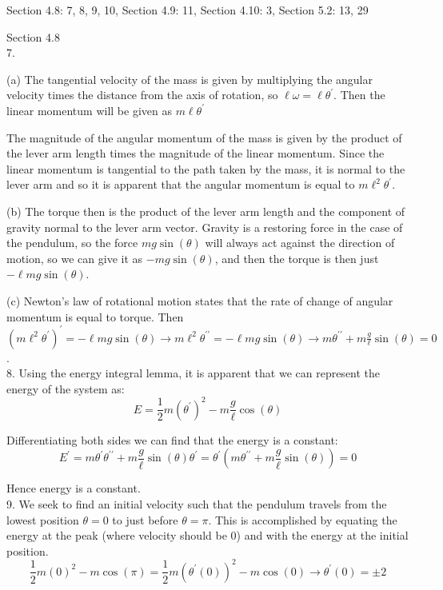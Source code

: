 \documentclass[11pt]{article}
\newcommand{\br}[1]{\left(#1\right)}
\newcommand{\dprime}{\prime\prime}
\begin{document}
Section 4.8: 7, 8, 9, 10, 
Section 4.9: 11, 
Section 4.10: 3, 
Section 5.2: 13, 29

Section 4.8 \\

7. 

(a) The tangential velocity of the mass is given by multiplying the angular velocity times the distance from the axis of rotation, so $\ell \omega  = \ell \theta^{\prime}$. Then the linear momentum will be given as $m\ell \theta^{\prime}$

The magnitude of the angular momentum of the mass is given by the product of the lever arm length times the magnitude of the linear momentum. Since the linear momentum is tangential to the path taken by the mass, it is normal to the lever arm and so it is apparent that the angular momentum is equal to $m\ell^2\theta^{\prime}$.

(b) The torque then is the product of the lever arm length and the component of gravity normal to the lever arm vector. Gravity is a restoring force in the case of the pendulum, so the force $mg\sin(\theta)$ will always act against the direction of motion, so we can give it as $-mg\sin(\theta)$, and then the torque is then just $-\ell mg\sin(\theta)$.

(c) Newton's law of rotational motion states that the rate of change of angular momentum is equal to torque. Then $\br{m\ell^2\theta^{\prime}}^{\prime} = -\ell mg\sin(\theta) \to m\ell^2\theta^{\dprime} = -\ell mg\sin(\theta) \to m\theta^{\dprime} + m\frac{g}{\ell}\sin(\theta) = 0$. \\

8. Using the energy integral lemma, it is apparent that we can represent the energy of the system as: $$E = \frac{1}{2}m\br{\theta^{\prime}}^2-m\frac{g}{\ell}\cos(\theta)$$

Differentiating both sides we can find that the energy is a constant: $$E^{\prime} = m\theta^{\prime}\theta^{\dprime} + m\frac{g}{\ell}\sin(\theta)\theta^{\prime} = \theta^{\prime}\br{m\theta^{\dprime} + m\frac{g}{\ell}\sin(\theta)} = 0$$ 

Hence energy is a constant.\\

9. We seek to find an initial velocity such that the pendulum travels from the lowest position $\theta = 0$ to just before $\theta = \pi$. This is accomplished by equating the energy at the peak (where velocity should be 0) and with the energy at the initial position.
$$\frac{1}{2}m\br{0}^2-m\cos(\pi) = \frac{1}{2}m\br{\theta^{\prime}(0)}^2-m\cos(0) \to \theta^{\prime}(0) = \pm 2$$
\end{document}
